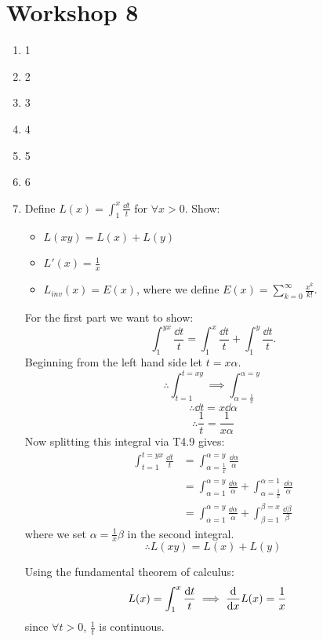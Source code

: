 \pagestyle{fancy}
\fancyhead{}

\section{Workshop 8}
\begin{enumerate}
    \item 1
    \item 2
    \item 3
    \item 4
    \item 5
    \item 6
    \newpage
    \item Define $L(x)=\displaystyle\int_{1}^{x}\frac{\dd t}{t}$
    for $\forall x>0$. Show:
    \begin{itemize}
        \item $L(xy)=L(x)+L(y)$
        \item $L'(x)=\displaystyle\frac{1}{x}$
        \item $L_{inv}(x)=E(x)$, where we define
        $E(x)=\displaystyle\sum_{k=0}^{\infty}\frac{x^k}{k!}$. \\
    \end{itemize}

    For the first part we want to show:
    $$\int_{1}^{yx}\frac{\dd t}{t}=\int_{1}^{x}\frac{\dd t}{t}
    +\int_{1}^{y}\frac{\dd t}{t}.$$
    Beginning from the left hand side let $t=x\alpha$.
    $$\therefore\int_{t=1}^{t=xy}\implies
    \int_{\alpha=\frac{1}{x}}^{\alpha=y}$$
    $$\therefore\dd t=x\dd \alpha$$
    $$\therefore\frac{1}{t}=\frac{1}{x\alpha}$$
    Now splitting this integral via T4.9 gives:
    \begin{align*}
        \int_{t=1}^{t=yx}\frac{\dd t}{t}
        &=\int_{\alpha=\frac{1}{x}}^{\alpha=y}
        \frac{\dd\alpha}{\alpha} \\
        &=\int_{\alpha=1}^{\alpha=y}
        \frac{\dd\alpha}{\alpha}+
        \int_{\alpha=\frac{1}{x}}^{\alpha=1}
        \frac{\dd\alpha}{\alpha} \\
        &=\int_{\alpha=1}^{\alpha=y}
        \frac{\dd\alpha}{\alpha}+
        \int_{\beta=1}^{\beta=x}
        \frac{\dd\beta}{\beta}
    \end{align*}
    where we set $\alpha=\frac{1}{x}\beta$ in the second integral.
    $$\therefore L(xy)=L(x)+L(y)$$

    Using the fundamental theorem of calculus:
    \begin{align*}
        L(x)=\displaystyle\int_{1}^{x}\frac{\dd t}{t}
        &\implies \dv{x}L(x)=\frac{1}{x}
    \end{align*}
    since $\forall t>0$, $\frac{1}{t}$ is continuous.


\end{enumerate}
